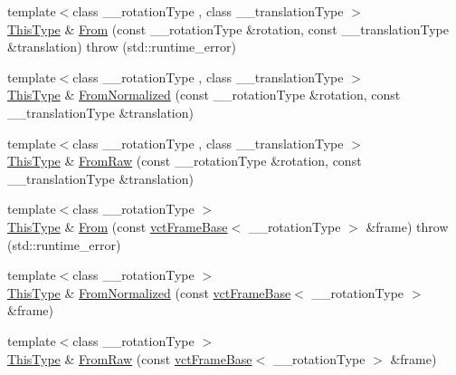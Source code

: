 {\bf }\par
\begin{DoxyCompactItemize}
\item 
{\footnotesize template$<$class \+\_\+\+\_\+rotation\+Type , class \+\_\+\+\_\+translation\+Type $>$ }\\\hyperlink{classvct_frame4x4_base_af6dcf167c0c3965872a095ce28853598}{This\+Type} \& \hyperlink{classvct_frame4x4_base_a32f3d44040d2896b4375a0b39368e9e7}{From} (const \+\_\+\+\_\+rotation\+Type \&rotation, const \+\_\+\+\_\+translation\+Type \&translation)  throw (std\+::runtime\+\_\+error)
\item 
{\footnotesize template$<$class \+\_\+\+\_\+rotation\+Type , class \+\_\+\+\_\+translation\+Type $>$ }\\\hyperlink{classvct_frame4x4_base_af6dcf167c0c3965872a095ce28853598}{This\+Type} \& \hyperlink{classvct_frame4x4_base_ac11a884f5cdb103b8fedda081156d1fd}{From\+Normalized} (const \+\_\+\+\_\+rotation\+Type \&rotation, const \+\_\+\+\_\+translation\+Type \&translation)
\item 
{\footnotesize template$<$class \+\_\+\+\_\+rotation\+Type , class \+\_\+\+\_\+translation\+Type $>$ }\\\hyperlink{classvct_frame4x4_base_af6dcf167c0c3965872a095ce28853598}{This\+Type} \& \hyperlink{classvct_frame4x4_base_a9459943051064e7721f9f22c698bdc48}{From\+Raw} (const \+\_\+\+\_\+rotation\+Type \&rotation, const \+\_\+\+\_\+translation\+Type \&translation)
\end{DoxyCompactItemize}

{\bf }\par
\begin{DoxyCompactItemize}
\item 
{\footnotesize template$<$class \+\_\+\+\_\+rotation\+Type $>$ }\\\hyperlink{classvct_frame4x4_base_af6dcf167c0c3965872a095ce28853598}{This\+Type} \& \hyperlink{classvct_frame4x4_base_ab65f11ae8f5d873aa6d0d1abf304dcba}{From} (const \hyperlink{classvct_frame_base}{vct\+Frame\+Base}$<$ \+\_\+\+\_\+rotation\+Type $>$ \&frame)  throw (std\+::runtime\+\_\+error)
\item 
{\footnotesize template$<$class \+\_\+\+\_\+rotation\+Type $>$ }\\\hyperlink{classvct_frame4x4_base_af6dcf167c0c3965872a095ce28853598}{This\+Type} \& \hyperlink{classvct_frame4x4_base_a93d12c3df23da1f9f5798e8146cc187a}{From\+Normalized} (const \hyperlink{classvct_frame_base}{vct\+Frame\+Base}$<$ \+\_\+\+\_\+rotation\+Type $>$ \&frame)
\item 
{\footnotesize template$<$class \+\_\+\+\_\+rotation\+Type $>$ }\\\hyperlink{classvct_frame4x4_base_af6dcf167c0c3965872a095ce28853598}{This\+Type} \& \hyperlink{classvct_frame4x4_base_a5ef2f82d1a0ac32c648e519e465dcd3d}{From\+Raw} (const \hyperlink{classvct_frame_base}{vct\+Frame\+Base}$<$ \+\_\+\+\_\+rotation\+Type $>$ \&frame)
\end{DoxyCompactItemize}

